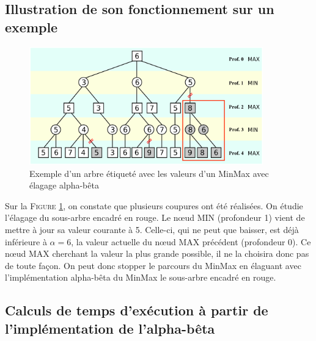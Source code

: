 \documentclass[11pt,a4paper]{article}
\begin{document}
\subsection{Illustration de son fonctionnement sur un exemple}

\begin{figure}[h]
\begin{center}
\includegraphics[width=0.9\textwidth]{figures/elagage/alphabeta.png}
\caption{Exemple d'un arbre étiqueté avec les valeurs d'un MinMax avec élagage alpha-bêta}
\label{fig:alphabeta}
\end{center}
\end{figure}

Sur la \textsc{Figure} \ref{fig:alphabeta}, on constate que plusieurs coupures ont été réalisées. On étudie l'élagage du sous-arbre encadré en rouge. Le nœud MIN (profondeur 1) vient de mettre à jour sa valeur courante à 5. Celle-ci, qui ne peut que baisser, est déjà inférieure à $\alpha=6$, la valeur actuelle du nœud MAX précédent (profondeur 0). Ce nœud MAX cherchant la valeur la plus grande possible, il ne la choisira donc pas de toute façon. On peut donc stopper le parcours du MinMax en élaguant avec l'implémentation alpha-bêta du MinMax le sous-arbre encadré en rouge.

\newpage

\subsection{Calculs de temps d'exécution à partir de l'implémentation de l'alpha-bêta}
\end{document}
